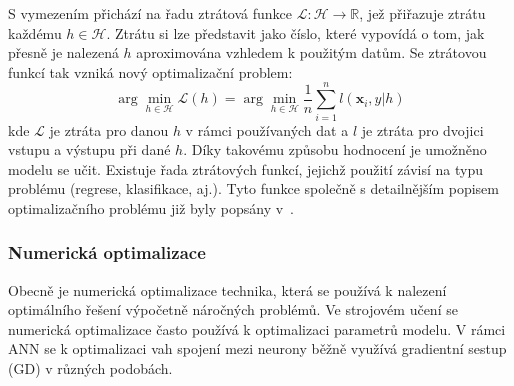 S vymezením přichází na řadu ztrátová funkce $\mathcal{L}:\mathcal{H}
    \rightarrow \mathbb{R}$, jež přiřazuje ztrátu každému $h \in \mathcal{H}$.
    Ztrátu si lze představit jako číslo, které vypovídá o tom, jak přesně je
    nalezená $h$ aproximována vzhledem k použitým datům. Se ztrátovou funkcí tak
    vzniká nový optimalizační problem:
\begin{equation}
    \arg\min_{h \in \mathcal{H}} \mathcal{L}(h) = \arg\min_{h \in \mathcal{H}} \frac{1}{n}\sum_{i=1}^nl(\textbf{x}_i,y|h)
\end{equation}
kde $\mathcal{L}$ je ztráta pro danou $h$ v rámci používaných dat a $l$ je
ztráta pro dvojici vstupu a výstupu při dané $h$. Díky takovému způsobu
hodnocení je umožněno modelu se učit. Existuje řada ztrátových funkcí, jejichž
použití závisí na typu problému (regrese, klasifikace, aj.). Tyto funkce
společně s detailnějším popisem optimalizačního problému již byly popsány
v~\cite{Murphy2012}.

\subsubsection{Numerická optimalizace}
Obecně je numerická optimalizace technika, která se používá k nalezení
optimálního řešení výpočetně náročných problémů. Ve strojovém učení se numerická
optimalizace často používá k optimalizaci parametrů modelu. V rámci \gls{ANN} se
k optimalizaci vah spojení mezi neurony běžně využívá gradientní sestup
(\gls{GD}) v různých podobách.

